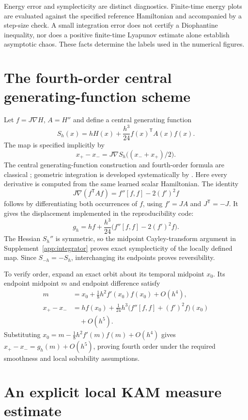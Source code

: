 \documentclass[doublespace,Afour,sageh,times]{sagej}
\theoremstyle{definition}
\begin{document}
Energy error and symplecticity are distinct diagnostics. Finite-time energy plots are evaluated against the specified reference Hamiltonian and accompanied by a step-size check. A small integration error does not certify a Diophantine inequality, nor does a positive finite-time Lyapunov estimate alone establish asymptotic chaos. These facts determine the labels used in the numerical figures.

\section{The fourth-order central generating-function scheme}
\label{app:central4}
Let $f=J\nabla H$, $A=H''$ and define a central generating function
\begin{equation}
 S_h(x)=hH(x)+\frac{h^3}{24}f(x)^{\mathsf T}A(x)f(x).
\end{equation}
The map is specified implicitly by
\begin{equation}
 x_+-x_-=J\nabla S_h\big((x_-+x_+)/2\big).
 \label{eq:central4}
\end{equation}
The central generating-function construction and fourth-order formula are classical \citep[Theorem~24, p.~90; formula on p.~95]{feng}; geometric integration is developed systematically by \citet{hairer}. Here every derivative is
computed from the same learned scalar Hamiltonian. The identity
\begin{equation}
 J\nabla(f^{\mathsf T}Af)=f''[f,f]-2(f')^2f
\end{equation}
follows by differentiating both occurrences of $f$, using $f'=JA$ and
$J^{\mathsf T}=-J$. It gives the displacement implemented in the
reproducibility code:
\begin{equation}
 g_h=hf+\frac{h^3}{24}\bigl(f''[f,f]-2(f')^2f\bigr).
\end{equation}
The Hessian $S_h''$ is symmetric, so the midpoint Cayley-transform argument
in Supplement~\ref{app:integrator} proves exact symplecticity of the
locally defined map. Since $S_{-h}=-S_h$, interchanging its endpoints
proves reversibility.

To verify order, expand an exact orbit about its temporal midpoint $x_0$.
Its endpoint midpoint $m$ and endpoint difference satisfy
\begin{align}
 m&=x_0+\tfrac18h^2f'(x_0)f(x_0)+O(h^4),\\
 x_+-x_-&=hf(x_0)+\tfrac1{24}h^3
       \bigl(f''[f,f]+(f')^2f\bigr)(x_0)\nonumber\\
       &\quad+O(h^5).
\end{align}
Substituting $x_0=m-\tfrac18h^2f'(m)f(m)+O(h^4)$ gives
$x_+-x_-=g_h(m)+O(h^5)$, proving fourth order under the required
smoothness and local solvability assumptions.



\section{An explicit local KAM measure estimate}



\end{document}
